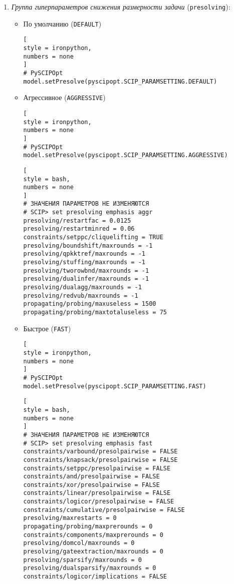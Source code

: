 \documentclass[%
	11pt,
	a4paper,
	utf8,
		]{article}
\begin{document}
\begin{enumerate}
	\item \emph{Группа гиперпараметров снижения размерности задачи} (\verb|presolving|):
	\begin{itemize}
		\item По умолчанию (\verb|DEFAULT|)
\begin{lstlisting}[
style = ironpython,
numbers = none
]
# PySCIPOpt
model.setPresolve(pyscipopt.SCIP_PARAMSETTING.DEFAULT)
\end{lstlisting}
		
		\item Агрессивное (\verb|AGGRESSIVE|)
\begin{lstlisting}[
style = ironpython,
numbers = none
]
# PySCIPOpt
model.setPresolve(pyscipopt.SCIP_PARAMSETTING.AGGRESSIVE)
\end{lstlisting}
\begin{lstlisting}[
style = bash,
numbers = none
]
# ЗНАЧЕНИЯ ПАРАМЕТРОВ НЕ ИЗМЕНЯЮТСЯ
# SCIP> set presolving emphasis aggr
presolving/restartfac = 0.0125
presolving/restartminred = 0.06
constraints/setppc/cliquelifting = TRUE
presolving/boundshift/maxrounds = -1
presolving/qpkktref/maxrounds = -1
presolving/stuffing/maxrounds = -1
presolving/tworowbnd/maxrounds = -1
presolving/dualinfer/maxrounds = -1
presolving/dualagg/maxrounds = -1
presolving/redvub/maxrounds = -1
propagating/probing/maxuseless = 1500
propagating/probing/maxtotaluseless = 75
\end{lstlisting}
		    \item Быстрое (\verb|FAST|)
\begin{lstlisting}[
style = ironpython,
numbers = none
]
# PySCIPOpt
model.setPresolve(pyscipopt.SCIP_PARAMSETTING.FAST)
\end{lstlisting}
\begin{lstlisting}[
style = bash,
numbers = none
]
# ЗНАЧЕНИЯ ПАРАМЕТРОВ НЕ ИЗМЕНЯЮТСЯ
# SCIP> set presolving emphasis fast
constraints/varbound/presolpairwise = FALSE
constraints/knapsack/presolpairwise = FALSE
constraints/setppc/presolpairwise = FALSE
constraints/and/presolpairwise = FALSE
constraints/xor/presolpairwise = FALSE
constraints/linear/presolpairwise = FALSE
constraints/logicor/presolpairwise = FALSE
constraints/cumulative/presolpairwise = FALSE
presolving/maxrestarts = 0
propagating/probing/maxprerounds = 0
constraints/components/maxprerounds = 0
presolving/domcol/maxrounds = 0
presolving/gateextraction/maxrounds = 0
presolving/sparsify/maxrounds = 0
presolving/dualsparsify/maxrounds = 0
constraints/logicor/implications = FALSE
\end{lstlisting}
	\end{itemize}


\end{enumerate}
\end{document}
